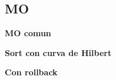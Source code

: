 \subsection{MO}
    \textbf{MO comun}
    

    \textbf{Sort con curva de Hilbert}
    

    \textbf{Con rollback}
    